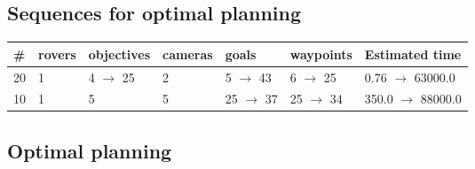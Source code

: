 \documentclass{article}
\begin{document}
                            \subsection*{Sequences for optimal planning}

                            \begin{center}
                            \begin{tabular}{@{}l|l|l|l|l|l|l@{}}
                            \# & rovers & objectives & cameras & goals & waypoints & Estimated time\\\midrule
                            20&1&4 $\rightarrow$ 25&2&5 $\rightarrow$ 43&6 $\rightarrow$ 25&0.76 $\rightarrow$ 63000.0\\
10&1&5&5&25 $\rightarrow$ 37&25 $\rightarrow$ 34&350.0 $\rightarrow$ 88000.0
                            \end{tabular}
                            \end{center}
                    
                                \subsection*{Optimal planning}
                                
\end{document}
